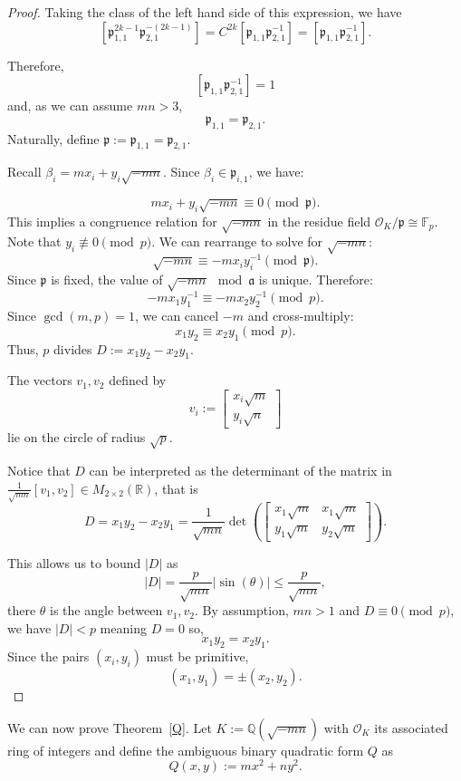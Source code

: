 \documentclass[11pt]{amsart}
\theoremstyle{definition}
\begin{document}
\begin{proof}
Taking the class of the left hand side of this expression, we have 
\[
[\mathfrak{p}_{1,1}^{2k-1}\mathfrak{p}_{2,1}^{-(2k-1)}]=C^{2k}[\mathfrak{p}_{1,1}\mathfrak{p}_{2,1}^{-1}]=[\mathfrak{p}_{1,1}\mathfrak{p}_{2,1}^{-1}].
\]

Therefore, 
\[
[\mathfrak{p}_{1,1}\mathfrak{p}_{2,1}^{-1}]=1
\]
and, as we can assume $mn > 3$, 
\[
\mathfrak{p}_{1,1}=\mathfrak{p}_{2,1}.
\]
Naturally, define $\mathfrak{p}:=\mathfrak{p}_{1,1}=\mathfrak{p}_{2,1}$.

Recall $\beta_i = mx_i + y_i\sqrt{-mn}$. Since $\beta_i \in \mathfrak{p}_{i,1}$, we have:

\[
mx_i + y_i\sqrt{-mn} \equiv 0 \pmod{\mathfrak{p}}.
\]
This implies a congruence relation for $\sqrt{-mn}$ in the residue field $\mathcal{O}_K/\mathfrak{p} \cong \mathbb{F}_p$. Note that $y_i \not\equiv 0 \pmod p$. We can rearrange to solve for $\sqrt{-mn}$:
\[
\sqrt{-mn} \equiv -m x_i y_i^{-1} \pmod{\mathfrak{p}}.
\]
Since $\mathfrak{p}$ is fixed, the value of $\sqrt{-mn} \mod{\mathfrak{a}}$ is unique. Therefore:
\[
-m x_1 y_1^{-1} \equiv -m x_2 y_2^{-1} \pmod{p}.
\]
Since $\gcd(m,p)=1$, we can cancel $-m$ and cross-multiply:
\[
x_1 y_2 \equiv x_2 y_1 \pmod{p}.
\]
Thus, $p$ divides $D:=x_1 y_2 - x_2 y_1$.

The vectors $v_1,v_2$ defined by
\[
v_i:=\begin{bmatrix}
    x_i\sqrt{m}\\
    y_i\sqrt{n}
\end{bmatrix}
\]
lie on the circle of radius $\sqrt{p}$.

Notice that $D$ can be interpreted as the determinant of the matrix in $\frac{1}{\sqrt{mn}}[v_1,v_2]\in M_{2\times 2}(\mathbb{R})$, that is
\[
D=x_1y_2-x_2y_1=\dfrac{1}{\sqrt{mn}}\det\left(\begin{bmatrix}
    x_1\sqrt{m} & x_1\sqrt{m}\\
    y_1\sqrt{m} & y_2\sqrt{m}
\end{bmatrix}\right).
\] 

This allows us to bound $|D|$ as 
\[
|D|=\dfrac{p}{\sqrt{mn}}|\sin(\theta)|\leq \dfrac{p}{\sqrt{mn}},
\]
there $\theta$ is the angle between $v_1,v_2$. By assumption, $mn>1$ and $D \equiv 0 \pmod p$, we have $|D| < p$ meaning $D = 0$ so,
\[
x_1 y_2 = x_2 y_1.
\]
Since the pairs $(x_i, y_i)$ must be primitive, 
\[
(x_1, y_1) = \pm (x_2, y_2).
\]
\end{proof}

We can now prove Theorem~\ref{Q}.  Let $K:=\mathbb{Q}(\sqrt{-mn})$ with $\mathcal{O}_K$ its associated ring of integers and define the ambiguous binary quadratic form $Q$ as
\[
Q(x,y):=mx^2+ny^2.
\]
\end{document}

